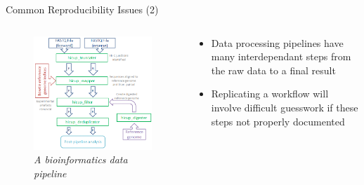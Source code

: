 \documentclass[10pt]{beamer}
\begin{document}
\begin{frame}{Common Reproducibility Issues (2)}
    \begin{columns}
        \begin{column}{0.5\textwidth}  %
            \begin{center}
                \begin{figure}
                    \includegraphics[width=1.1\textwidth]{images/pipeline.png}
                    \caption*{{\sl A bioinformatics data pipeline}}
                \end{figure}
            \end{center}
        \end{column}
        \begin{column}{0.5\textwidth}
            \begin{itemize}
                \item Data processing pipelines have many interdependant steps
                from the raw data to a final result 
                \item Replicating a workflow will involve difficult guesswork if these steps not properly documented 
            \end{itemize}
        \end{column}
    \end{columns}
\end{frame}
\end{document}

